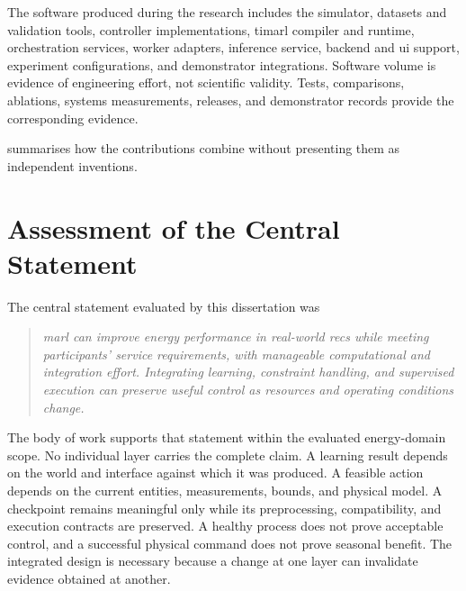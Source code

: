 The software produced during the research includes the simulator, datasets and validation tools, controller implementations, \gls{timarl} compiler and runtime, orchestration services, worker adapters, inference service, backend and \gls{ui} support, experiment configurations, and demonstrator integrations. Software volume is evidence of engineering effort, not scientific validity. Tests, comparisons, ablations, systems measurements, releases, and demonstrator records provide the corresponding evidence.

 summarises how the contributions combine without presenting them as independent inventions.


\clearpage
\section{Assessment of the Central Statement}
\label{sec:conclusion-assessment}

The central statement evaluated by this dissertation was

\begin{quote}
\emph{\gls{marl} can improve energy performance in real-world \glspl{rec} while meeting participants' service requirements, with manageable computational and integration effort. Integrating learning, constraint handling, and supervised execution can preserve useful control as resources and operating conditions change.}
\end{quote}

The body of work supports that statement within the evaluated energy-domain scope. No individual layer carries the complete claim. A learning result depends on the world and interface against which it was produced. A feasible action depends on the current entities, measurements, bounds, and physical model. A checkpoint remains meaningful only while its preprocessing, compatibility, and execution contracts are preserved. A healthy process does not prove acceptable control, and a successful physical command does not prove seasonal benefit. The integrated design is necessary because a change at one layer can invalidate evidence obtained at another.

